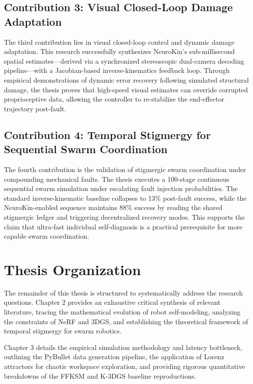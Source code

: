 ﻿\documentclass[12pt,a4paper,oneside]{report}
\begin{document}
\subsection{Contribution 3: Visual Closed-Loop Damage Adaptation}

The third contribution lies in visual closed-loop control and dynamic damage adaptation. This research successfully synthesizes NeuroKin's sub-millisecond spatial estimates---derived via a synchronized stereoscopic dual-camera decoding pipeline---with a Jacobian-based inverse-kinematics feedback loop. Through empirical demonstrations of dynamic error recovery following simulated structural damage, the thesis proves that high-speed visual estimates can override corrupted proprioceptive data, allowing the controller to re-stabilize the end-effector trajectory post-fault.

\subsection{Contribution 4: Temporal Stigmergy for Sequential Swarm Coordination}

The fourth contribution is the validation of stigmergic swarm coordination under compounding mechanical faults. The thesis executes a 100-stage continuous sequential swarm simulation under escalating fault injection probabilities. The standard inverse-kinematic baseline collapses to 13\% post-fault success, while the NeuroKin-enabled sequence maintains 88\% success by reading the shared stigmergic ledger and triggering decentralized recovery modes. This supports the claim that ultra-fast individual self-diagnosis is a practical prerequisite for more capable swarm coordination.

\section{Thesis Organization}

The remainder of this thesis is structured to systematically address the research questions. Chapter 2 provides an exhaustive critical synthesis of relevant literature, tracing the mathematical evolution of robot self-modeling, analyzing the constraints of NeRF and 3DGS, and establishing the theoretical framework of temporal stigmergy for swarm robotics.

Chapter 3 details the empirical simulation methodology and latency bottleneck, outlining the PyBullet data generation pipeline, the application of Lorenz attractors for chaotic workspace exploration, and providing rigorous quantitative breakdowns of the FFKSM and K-3DGS baseline reproductions.
\end{document}
